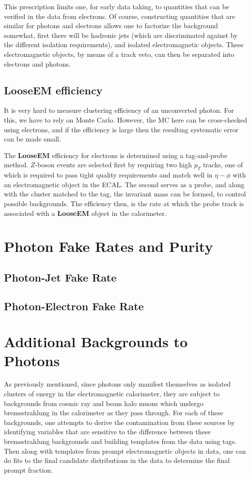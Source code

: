 \documentclass{cmspaper}
\begin{document}
This prescription limits one, for early data taking, to quantities that can be verified in the data from electrons.  Of course, constructing quantities that are similar for photons and electrons allows one to factorize the background somewhat, first there will be hadronic jets (which are discriminated against by the different isolation requirements), and isolated electromagnetic objects.  These electromagnetic objects, by means of a track veto, can then be separated into electrons and photons.

\subsection{LooseEM efficiency}\label{ssec:LooseEMEff}

It is very hard to measure clustering efficiency of an unconverted photon. For this, we have to rely on Monte Carlo.
However, the MC here can be cross-checked using electrons, and if the efficiency is large then the resulting systematic error can be made small. 

The {\bf LooseEM} efficiency for electrons is determined using a tag-and-probe method.  $Z$-boson events are selected first by requiring two high $p_T$ tracks, one of which is required to pass tight quality requirements and match well in $\eta-\phi$ with an electromagnetic object in the ECAL.  The second serves as a probe, and along with the cluster matched to the tag, the invariant mass can be formed, to control possible backgrounds.  The efficiency then, is the rate at which the probe track is associated with a {\bf LooseEM} object in the calorimeter.

\section{Photon Fake Rates and Purity}
\subsection{Photon-Jet Fake Rate}
\subsection{Photon-Electron Fake Rate}


\section{Additional Backgrounds to Photons}
As previously mentioned, since photons only manifest themselves as isolated clusters of energy in the electromagnetic calorimeter, they are subject to backgrounds from cosmic ray and beam halo muons which undergo bremsstrahlung in the calorimeter as they pass through.  For each of these backgrounds, one attempts to derive the contamination from these sources by identifying variables that are sensitive to the difference between these bremsstrahlung backgrounds and building templates from the data using tags.  Then along with templates from prompt electromagnetic objects in data, one can do fits to the final candidate distributions in the data to determine the final prompt fraction.
\end{document}
